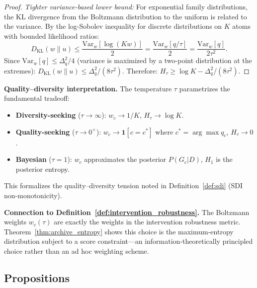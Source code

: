 \documentclass{article}
\theoremstyle{definition}
\theoremstyle{plain}
\theoremstyle{remark}
\begin{document}
\begin{proof}
\emph{Tighter variance-based lower bound:} For exponential family distributions, the
KL divergence from the Boltzmann distribution to the uniform is related to the variance.
By the log-Sobolev inequality for discrete distributions on $K$ atoms with bounded
likelihood ratios:
\begin{equation}
  D_{\mathrm{KL}}(w \| u) \leq \frac{\mathrm{Var}_w[\log(Kw)]}{2}
  = \frac{\mathrm{Var}_w[q/\tau]}{2} = \frac{\mathrm{Var}_w[q]}{2\tau^2}.
\end{equation}
Since $\mathrm{Var}_w[q] \leq \Delta_q^2/4$ (variance is maximized by a two-point
distribution at the extremes):
$D_{\mathrm{KL}}(w \| u) \leq \Delta_q^2/(8\tau^2)$. Therefore:
$H_\tau \geq \log K - \Delta_q^2/(8\tau^2)$.
\end{proof}

\textbf{Quality--diversity interpretation.} The temperature $\tau$ parametrizes the
fundamental tradeoff:
\begin{itemize}
  \item \textbf{Diversity-seeking} ($\tau \to \infty$): $w_c \to 1/K$, $H_\tau \to \log K$.
  \item \textbf{Quality-seeking} ($\tau \to 0^+$): $w_c \to \mathbf{1}[c = c^*]$ where
    $c^* = \arg\max q_c$, $H_\tau \to 0$.
  \item \textbf{Bayesian} ($\tau = 1$): $w_c$ approximates the posterior $P(G_c | D)$,
    $H_1$ is the posterior entropy.
\end{itemize}
This formalizes the quality--diversity tension noted in Definition~\ref{def:sdi}
(SDI non-monotonicity).

\textbf{Connection to Definition~\ref{def:intervention_robustness}.} The Boltzmann weights
$w_c(\tau)$ are exactly the weights in the intervention robustness metric. Theorem~\ref{thm:archive_entropy} shows this choice is the maximum-entropy distribution subject to a
score constraint---an information-theoretically principled choice rather than an
ad hoc weighting scheme.





\subsection{Propositions}
\end{document}
